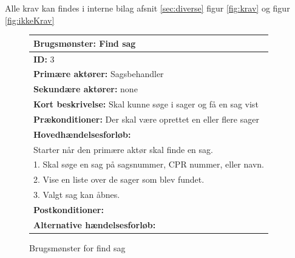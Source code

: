 Alle krav kan findes i interne bilag afsnit \ref{sec:diverse} figur \ref{fig:krav} og figur \ref{fig:ikkeKrav} 
\begin{figure} [hbt!]
\begin{longtable}{|p{18cm}|}
\hline
\textbf{Brugsmønster: }Find sag \\
\hline
\textbf{ID: }3\\
\hline
\textbf{Primære aktører: }Sagsbehandler\\
\hline
\textbf{Sekundære aktører: }none\\
\hline
\textbf{Kort beskrivelse: }Skal kunne søge i sager og få en sag vist\\
\hline
\textbf{Prækonditioner: }Der skal være oprettet en eller flere sager\\
\hline
\textbf{Hovedhændelsesforløb: }\\
Starter når den primære aktør skal finde en sag.\\
1. Skal søge en sag på sagsnummer, CPR nummer, eller navn.\\
2. Vise en liste over de sager som blev fundet.\\
3. Valgt sag kan åbnes.\\
\hline
\textbf{Postkonditioner: }\\
\hline
\textbf{Alternative hændelsesforløb: }\\
\hline
\end{longtable}
\caption{Brugsmønster for find sag}
\label{tab:findSag}
\end{figure}



